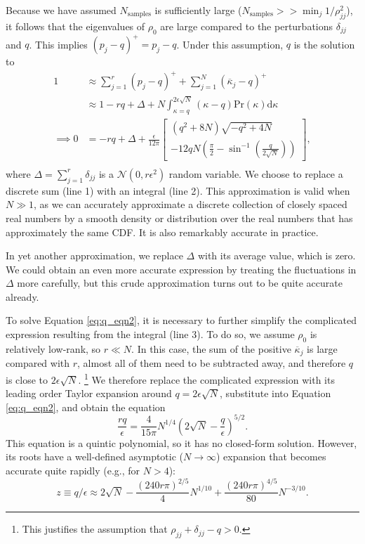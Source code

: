 \documentclass[aps,pra, twocolumn]{revtex4-1}
\begin{document}
Because we have assumed $N_{\mathrm{samples}}$ is sufficiently large ($N_{\mathrm{samples}} >> \min_{j}1/\rho_{jj}^{2}$), it follows that the eigenvalues of $\rho_{0}$ are large compared to the perturbations $\delta_{jj}$ and $q$. This implies $(p_{j} - q)^{+} = p_{j} - q$. Under this assumption, $q$ is the solution to
\begin{align}
\nonumber 1 &\approx \sum_{j=1}^{r}(p_j - q)^{+} + \sum_{j=1}^{N}{(\overline{\kappa}_j-q)^+}\\
\nonumber &\approx 1 - rq + \Delta + N\int_{\kappa=q}^{2\epsilon\sqrt{N}}{(\kappa-q)\mathrm{Pr}(\kappa)\mathrm{d}\kappa}\\
\label{eq:q_eqn2}\implies 0 &= - rq + \Delta + \frac{\epsilon}{12\pi}\left[
\begin{array}{l} (q^2+8N)\sqrt{-q^2+4N} \\
-12qN\left(\frac{\pi}{2}-\sin^{-1}\left(\frac{q}{2\sqrt{N}}\right)\right)
\end{array}\right],\nonumber\\
~
\end{align}
where $\Delta = \sum_{j=1}^{r}\delta_{jj}$ is a $\mathcal{N}(0,r\epsilon^2)$ random variable.  We choose to replace a discrete 
sum (line 1) with an integral (line 2). This approximation is valid when $N\gg1$, as we can accurately approximate a discrete collection of closely spaced real numbers by a smooth density or distribution over the real numbers that has approximately the same CDF.  It is also remarkably accurate in practice.
  
In yet another approximation, we replace $\Delta$ with its average value, which is zero.  We could obtain an even more accurate expression 
 by treating the fluctuations in $\Delta$ more carefully, but this crude approximation turns out to be quite accurate already.

To solve Equation \eqref{eq:q_eqn2}, it is necessary to further simplify the complicated expression resulting from the integral (line 3).  To do so, we 
assume  $\rho_0$ is relatively low-rank, so $r \ll N$.  In this case, the sum of the positive $\overline{\kappa}_j$ is large compared 
with $r$, almost all of them need to be subtracted away, and therefore $q$ is close to $2\epsilon\sqrt{N}$.  \footnote{This justifies the assumption that $\rho_{jj} + \delta_{jj} - q > 0$.} We therefore replace 
the complicated expression with its leading order Taylor expansion around $q=2\epsilon\sqrt{N}$, substitute into Equation \eqref{eq:q_eqn2}, and 
obtain the equation
\begin{equation}
\frac{rq}{\epsilon}  = \frac{4}{15\pi}N^{1/4}\left(2\sqrt{N}-\frac{q}{\epsilon}\right)^{5/2}.
\end{equation}
This equation is a quintic polynomial, so it has no closed-form solution.  However, its roots have a well-defined asymptotic ($N\to
\infty$) expansion that becomes accurate quite rapidly (e.g., for $N>4$):
\begin{equation}
\label{eq:truncation}
z \equiv q/\epsilon \approx 2\sqrt{N}-\frac{(240r\pi)^{2/5}}{4}N^{1/10}+\frac{(240r\pi)^{4/5}}{80}N^{-3/10}.
\end{equation}
\end{document}
